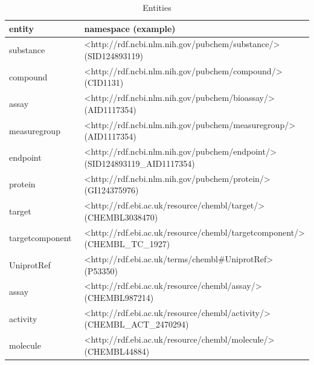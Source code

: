 \begin{table}[]
\caption{Entities}
\label{tab:opddr_02}
\centering
\begin{tabular}{p{0.3\linewidth}p{0.7\linewidth}}
\hline
\textbf{entity} & \textbf{namespace (example)} \\
\hline
substance & \makecell[l]{\textless http://rdf.ncbi.nlm.nih.gov/pubchem/substance/\textgreater \\ (SID124893119)} \\
compound & \makecell[l]{\textless http://rdf.ncbi.nlm.nih.gov/pubchem/compound/\textgreater \\ (CID1131)} \\
assay & \makecell[l]{\textless http://rdf.ncbi.nlm.nih.gov/pubchem/bioassay/\textgreater \\ (AID1117354)} \\
measuregroup & \makecell[l]{\textless http://rdf.ncbi.nlm.nih.gov/pubchem/measuregroup/\textgreater \\ (AID1117354)} \\
endpoint & \makecell[l]{\textless http://rdf.ncbi.nlm.nih.gov/pubchem/endpoint/\textgreater \\ (SID124893119\_AID1117354)} \\
protein & \makecell[l]{\textless http://rdf.ncbi.nlm.nih.gov/pubchem/protein/\textgreater \\ (GI124375976)} \\
target & \makecell[l]{\textless http://rdf.ebi.ac.uk/resource/chembl/target/\textgreater \\ (CHEMBL3038470)} \\
targetcomponent & \makecell[l]{\textless http://rdf.ebi.ac.uk/resource/chembl/targetcomponent/\textgreater \\ (CHEMBL\_TC\_1927)} \\
UniprotRef & \makecell[l]{\textless http://rdf.ebi.ac.uk/terms/chembl\#UniprotRef\textgreater \\ (P53350)} \\
assay & \makecell[l]{\textless http://rdf.ebi.ac.uk/resource/chembl/assay/\textgreater \\ (CHEMBL987214)} \\
activity & \makecell[l]{\textless http://rdf.ebi.ac.uk/resource/chembl/activity/\textgreater \\ (CHEMBL\_ACT\_2470294)} \\
molecule & \makecell[l]{\textless http://rdf.ebi.ac.uk/resource/chembl/molecule/\textgreater \\ (CHEMBL44884)} \\
\hline
\end{tabular}
\end{table}

